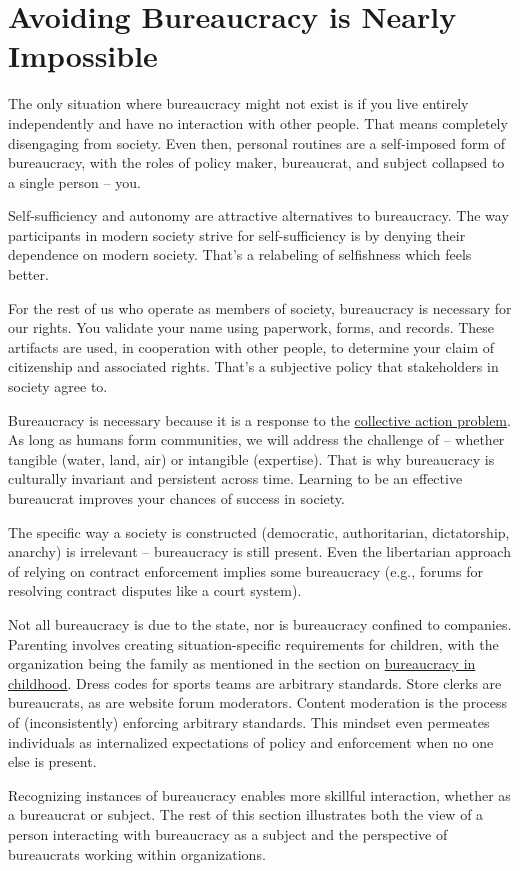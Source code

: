 

\section{Avoiding Bureaucracy is Nearly Impossible}

The only situation where bureaucracy might not exist is if you live entirely independently and have no interaction with other people. That means completely disengaging from society. Even then, personal routines are a self-imposed form of bureaucracy, with the roles of policy maker, bureaucrat, and subject collapsed to a single person -- you.

Self-sufficiency and autonomy are attractive alternatives to bureaucracy. The way participants in modern society strive for self-sufficiency is by denying their dependence on modern society. That's a relabeling of selfishness which feels better. 

For the rest of us who operate as members of  society, bureaucracy is necessary for our rights. You validate your name using paperwork, forms, and records. These artifacts are used, in cooperation with other people, to determine your claim of citizenship and associated rights. That's a subjective policy that \glspl{stakeholder} in society agree to. 


Bureaucracy is necessary because it is a response to the \iftoggle{WPinmargin}{\marginpar{[Wikipedia] Collective\\action problem}}{}
\href{https://en.wikipedia.org/wiki/Collective_action_problem}{collective action problem}. 
As long as humans form communities, we will address the challenge of \iftoggle{glossarysubstitutionworks}{\glspl{shared resource}}{shared resources}
 -- whether tangible (water, land, air) or intangible (expertise). 
That is why bureaucracy is culturally invariant and persistent across time.
Learning to be an effective bureaucrat improves your chances of success in society. 

The specific way a society is constructed (democratic, authoritarian, dictatorship, anarchy) is irrelevant -- bureaucracy is still present. Even the libertarian approach of relying on contract enforcement implies some bureaucracy (e.g., forums for resolving contract disputes like a court system). 


Not all bureaucracy is due to the state, nor is bureaucracy confined to companies. Parenting involves creating situation-specific requirements for children, with the organization being the family as mentioned in the section 
on \hyperref[sec:bureaucracy-early-childhood]{bureaucracy in childhood}.
Dress codes for sports teams are arbitrary standards. 
Store clerks are bureaucrats, as are website forum moderators.  Content moderation is the process of (inconsistently) enforcing arbitrary standards. This mindset even permeates individuals as internalized expectations of policy and enforcement when no one else is present. 

Recognizing instances of bureaucracy enables more skillful interaction, whether as a bureaucrat or subject. The rest of this section illustrates both the view of a person interacting with bureaucracy as a \gls{subject} and the perspective of bureaucrats working within organizations. 




